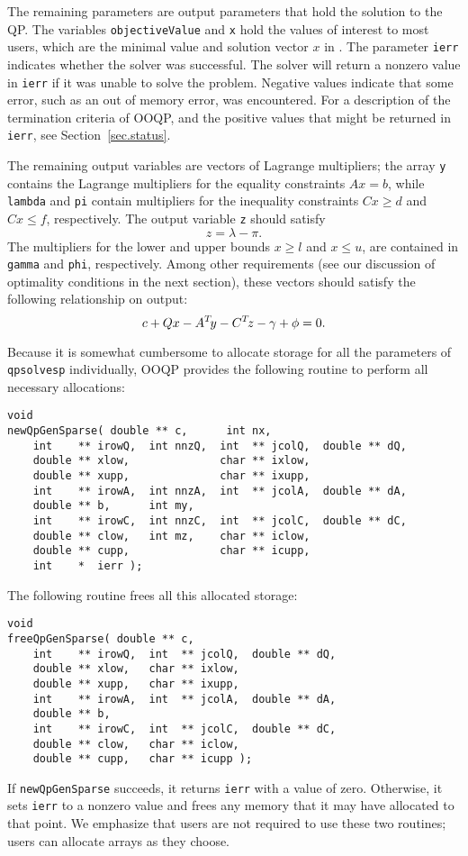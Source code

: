 The remaining parameters are output parameters that hold the solution
to the QP. The variables \texttt{objectiveValue} and \texttt{x} hold
the values of interest to most users, which are the minimal value and
solution vector $x$ in . The parameter \texttt{ierr}
indicates whether the solver was successful. The solver will return a
nonzero value in \texttt{ierr} if it was unable to solve the problem.
Negative values indicate that some error, such as an out of memory
error, was encountered. For a description of the termination criteria
of OOQP, and the positive values that might be returned in
\texttt{ierr}, see Section~\ref{sec.status}.


The remaining output variables are vectors of Lagrange
multipliers; the array \texttt{y} contains the Lagrange multipliers
for the equality constraints $Ax=b$, while \texttt{lambda} and
\texttt{pi} contain multipliers for the inequality constraints $Cx \ge
d$ and $Cx \le f$, respectively. The output variable \texttt{z} should
satisfy
$$
z = \lambda - \pi.
$$
The multipliers for the lower and upper bounds $x \ge l$ and $x \le
u$, are contained in \texttt{gamma} and \texttt{phi}, respectively.
Among other requirements (see our discussion of optimality conditions
in the next section), these vectors should satisfy the following
relationship on output:
\[
c + Q x - A^T\! y - C^T\! z - \gamma + \phi = 0.
\]

Because it is somewhat cumbersome to allocate storage for all the
parameters of \texttt{qpsolvesp} individually, OOQP provides the
following routine to perform all necessary allocations:
\begin{verbatim}
void 
newQpGenSparse( double ** c,      int nx,
    int    ** irowQ,  int nnzQ,  int  ** jcolQ,  double ** dQ,
    double ** xlow,              char ** ixlow,
    double ** xupp,              char ** ixupp,
    int    ** irowA,  int nnzA,  int  ** jcolA,  double ** dA,
    double ** b,      int my,
    int    ** irowC,  int nnzC,  int  ** jcolC,  double ** dC,
    double ** clow,   int mz,    char ** iclow,
    double ** cupp,              char ** icupp,
    int    *  ierr );
\end{verbatim}

The following routine frees all this allocated storage:
\begin{verbatim}
void 
freeQpGenSparse( double ** c,      
    int    ** irowQ,  int  ** jcolQ,  double ** dQ,
    double ** xlow,   char ** ixlow,
    double ** xupp,   char ** ixupp,
    int    ** irowA,  int  ** jcolA,  double ** dA,
    double ** b,
    int    ** irowC,  int  ** jcolC,  double ** dC,
    double ** clow,   char ** iclow,
    double ** cupp,   char ** icupp );
\end{verbatim}
If \texttt{newQpGenSparse} succeeds, it returns \texttt{ierr} with a
value of zero. Otherwise, it sets \texttt{ierr} to a nonzero value
and frees any memory that it may have allocated to that point. We
emphasize that users are not required to use these two routines; users
can allocate arrays as they choose.

